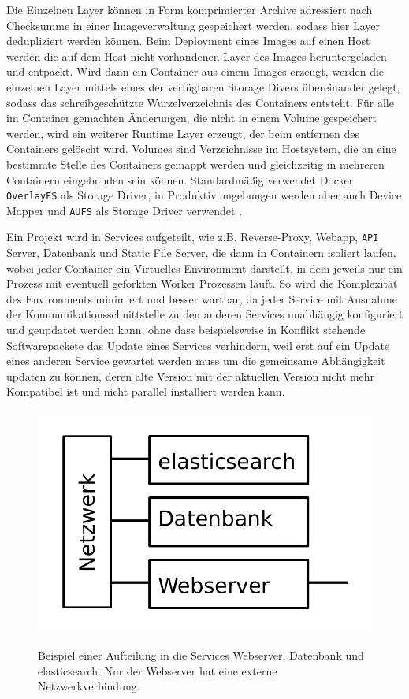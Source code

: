 Die Einzelnen Layer können in Form komprimierter Archive adressiert nach
Checksumme in einer Imageverwaltung gespeichert werden, sodass hier Layer
dedupliziert werden können. Beim Deployment eines Images auf einen Host werden
die auf dem Host nicht vorhandenen Layer des Images heruntergeladen und
entpackt. Wird dann ein Container aus einem Images erzeugt, werden die einzelnen
Layer mittels eines der verfügbaren Storage Divers übereinander gelegt, sodass
das schreibgeschützte Wurzelverzeichnis des Containers entsteht. Für alle im
Container gemachten Änderungen, die nicht in einem Volume gespeichert werden,
wird ein weiterer Runtime Layer erzeugt, der beim entfernen des Containers
gelöscht wird. Volumes sind Verzeichnisse im Hostsystem, die an eine bestimmte
Stelle des Containers gemappt werden und gleichzeitig in mehreren Containern
eingebunden sein können. Standardmäßig verwendet Docker \texttt{OverlayFS} als
Storage Driver, in Produktivumgebungen werden aber auch Device Mapper und
\texttt{AUFS} als Storage Driver verwendet \cite{docker-storage-driver}.

Ein Projekt wird in Services aufgeteilt, wie z.B. Reverse-Proxy, Webapp,
\texttt{API} Server, Datenbank und Static File Server, die dann in Containern
isoliert laufen, wobei jeder Container ein Virtuelles Environment darstellt, in
dem  jeweils nur ein Prozess mit eventuell geforkten Worker Prozessen läuft. So
wird die Komplexität des Environments minimiert und besser wartbar, da jeder
Service mit Ausnahme der Kommunikationsschnittstelle zu den anderen Services
unabhängig konfiguriert und geupdatet werden kann, ohne dass beispielsweise in
Konflikt stehende Softwarepackete das Update eines Services verhindern, weil
erst auf ein Update eines anderen Service gewartet werden muss um die gemeinsame
Abhängigkeit updaten zu können, deren alte Version mit der aktuellen Version
nicht mehr Kompatibel ist und nicht parallel installiert werden kann.

\begin{figure}
  \includegraphics[width=\columnwidth/2]{images/docker-services-example-2.pdf}

  Beispiel einer Aufteilung in die Services Webserver, Datenbank und
  elasticsearch. Nur der Webserver hat eine externe Netzwerkverbindung.
\end{figure}

